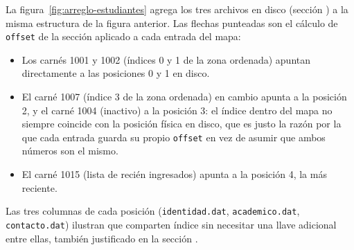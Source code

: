 La figura~\ref{fig:arreglo-estudiantes} agrega los tres archivos en disco (sección ) a la misma estructura de la
figura anterior. Las flechas punteadas son el cálculo de \texttt{offset} de la sección  aplicado a
cada entrada del mapa: 
\begin{itemize}
    \item Los carnés 1001 y 1002 (índices 0 y 1 de la zona ordenada) apuntan directamente a las posiciones 0 y 1 en disco.
    \item El carné 1007 (índice 3 de la zona ordenada) en cambio apunta a la posición 2, y el carné 1004 (inactivo) a la posición 3: 
        el índice dentro del mapa no siempre coincide con la posición física en disco, que es justo la razón por la que cada entrada 
        guarda su propio \texttt{offset} en vez de asumir que ambos números son el mismo.
    \item El carné 1015 (lista de recién ingresados) apunta a la posición 4, la más reciente.
\end{itemize}

Las tres columnas de cada posición (\texttt{identidad.dat}, \texttt{academico.dat}, \texttt{contacto.dat}) ilustran que comparten 
índice sin necesitar una llave adicional entre ellas, también justificado en la sección .
